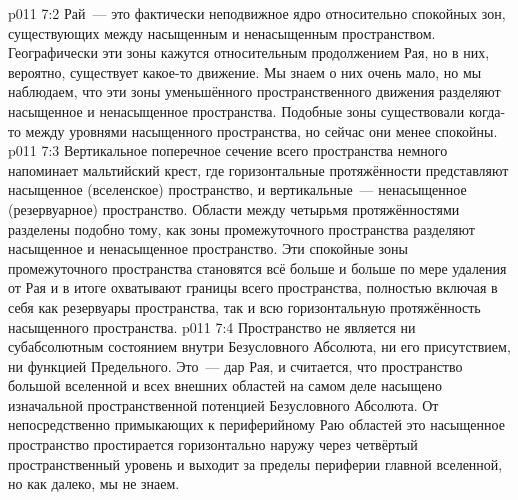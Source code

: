 \vs p011 7:2 Рай~--- это фактически неподвижное ядро относительно спокойных зон, существующих между насыщенным и ненасыщенным пространством. Географически эти зоны кажутся относительным продолжением Рая, но в них, вероятно, существует какое\hyp{}то движение. Мы знаем о них очень мало, но мы наблюдаем, что эти зоны уменьшённого пространственного движения разделяют насыщенное и ненасыщенное пространства. Подобные зоны существовали когда\hyp{}то между уровнями насыщенного пространства, но сейчас они менее спокойны.
\vs p011 7:3 Вертикальное поперечное сечение всего пространства немного напоминает мальтийский крест, где горизонтальные протяжённости представляют насыщенное (вселенское) пространство, и вертикальные~--- ненасыщенное (резервуарное) пространство. Области между четырьмя протяжённостями разделены подобно тому, как зоны промежуточного пространства разделяют насыщенное и ненасыщенное пространство. Эти спокойные зоны промежуточного пространства становятся всё больше и больше по мере удаления от Рая и в итоге охватывают границы всего пространства, полностью включая в себя как резервуары пространства, так и всю горизонтальную протяжённость насыщенного пространства.
\vs p011 7:4 \pc Пространство не является ни субабсолютным состоянием внутри Безусловного Абсолюта, ни его присутствием, ни функцией Предельного. Это~--- дар Рая, и считается, что пространство большой вселенной и всех внешних областей на самом деле насыщено изначальной пространственной потенцией Безусловного Абсолюта. От непосредственно примыкающих к периферийному Раю областей это насыщенное пространство простирается горизонтально наружу через четвёртый пространственный уровень и выходит за пределы периферии главной вселенной, но как далеко, мы не знаем.
